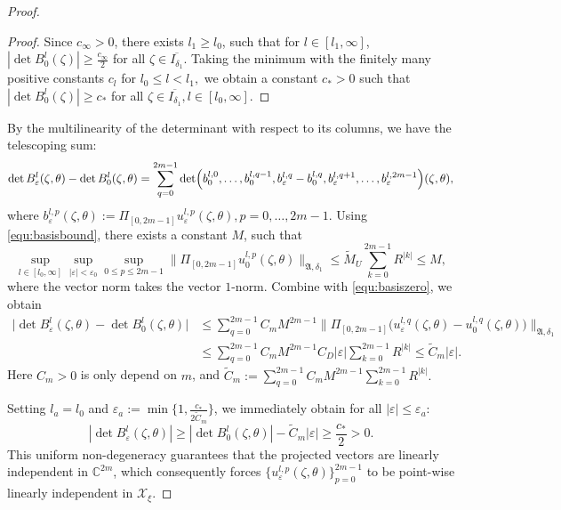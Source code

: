 \documentclass[reqno,11pt]{amsart}
\newcommand{\C}{{\mathbb C}}
\begin{document}
\begin{proof}
\begin{proof}
Since $c_\infty>0$, there exists $l_1\geq l_0$, such that for $l\in[ l_1,\infty]$,
$
|\det B_0^l(\zeta)|\ge \frac{c_\infty}{2}
$ for all $ \zeta\in\overline{I_{\delta_1}}.$
Taking the minimum with the finitely many positive constants $c_l$ for
$
l_0\le l<l_1,
$
we obtain a constant $c_*>0$ such that
$
| \det B_0^l(\zeta)|\ge c_*
$ for all $\zeta\in\overline{I_{\delta_1}}, l\in[l_0,\infty].$
\end{proof}



By the multilinearity of the determinant with respect to its columns, we have the  telescoping sum:
\begin{align*}
\det B_\varepsilon^l(\zeta,\theta)-\det B_0^l(\zeta,\theta) =
\sum_{q=0}^{2m-1}\det\Bigl(
b_0^{l,0},\ldots,b_0^{l,q-1},
b_\varepsilon^{l,q}-b_0^{l,q},
b_\varepsilon^{l,q+1},\ldots,b_\varepsilon^{l,2m-1}
\Bigr)(\zeta,\theta),
\end{align*}
where
$
b_\varepsilon^{l,p}(\zeta,\theta):=
\Pi_{[0,2m-1]}u_\varepsilon^{l,p}(\zeta,\theta),
p=0,\ldots,2m-1.
$
Using \eqref{equ:basisbound}, there exists a constant $M$, such that $$\sup_{l\in[l_0,\infty]}\sup_{|\varepsilon|<\varepsilon_0}\sup_{0\le p\le 2m-1}
\bigl\|\Pi_{[0,2m-1]}u_0^{l,p}(\zeta,\theta)\bigr\|_{\mathfrak A,\delta_1}\leq \tilde M_U \sum_{k=0}^{2m-1}R^{|k|}\leq M,$$
where the vector norm takes the vector $1$-norm.
Combine with \eqref{equ:basiszero}, we obtain
\begin{align*}
\bigl|
\det B_\varepsilon^l(\zeta,\theta)-\det B_0^l(\zeta,\theta)\bigr| 
&\le\sum_{q=0}^{2m-1}C_m M^{2m-1}\bigl\|\Pi_{[0,2m-1]}\bigl(u_\varepsilon^{l,q}(\zeta,\theta)
-u_0^{l,q}(\zeta,\theta)\bigr)\bigr\|_{\mathfrak A,\delta_1}\\
&\leq
\sum_{q=0}^{2m-1}C_m M^{2m-1}C_D |\varepsilon| 
\sum_{k=0}^{2m-1}R^{|k|}
\le\tilde C_m |\varepsilon|.
\end{align*}
Here $C_m>0$ is only depend on $m$, and $\tilde C_m:=\sum_{q=0}^{2m-1}
C_m M^{2m-1}\sum_{k=0}^{2m-1}R^{|k|}.$

Setting $l_a = l_0$ and $\varepsilon_a := \min\{1, \frac{c_*}{2\tilde C_m }\}$, we immediately obtain for all $|\varepsilon| \le \varepsilon_a$:
\begin{equation}\label{equ:det}
    |\det B_\varepsilon^l(\zeta,\theta)| \ge |\det B_0^l(\zeta,\theta)| - \tilde C_m |\varepsilon| \ge \frac{c_*}{2} > 0.
\end{equation}
This uniform non-degeneracy  guarantees that the projected vectors are linearly independent in $\C^{2m}$, which consequently forces $\{u_\varepsilon^{l,p}(\zeta,\theta)\}_{p=0}^{2m-1}$ to be point-wise linearly independent in $\mathcal{X}_\xi$. 
\end{proof}
\end{document}
